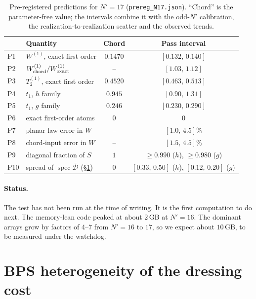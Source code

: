 \documentclass[11pt]{article}
\newcommand{\Np}{N'}
\newcommand{\Dbar}{\bar{\mathcal D}}
\newcommand{\Wone}{W^{(1)}}
\theoremstyle{plain}
\theoremstyle{remark}
\numberwithin{equation}{section}
\begin{document}
\begin{table}[ht]
\centering\small
\caption{Pre-registered predictions for $\Np=17$ (\texttt{prereg\_N17.json}). ``Chord'' is the parameter-free value; the
intervals combine it with the odd-$\Np$ calibration, the realization-to-realization scatter and the observed trends.}
\label{tab:prereg}
\begin{tabular}{@{}l>{\raggedright\arraybackslash}p{}cc@{}}\toprule
& Quantity & Chord & Pass interval\\\midrule
P1 & $\Wone$, exact first order & $0.1470$ & $[0.132,\,0.140]$\\
P2 & $\Wone_{\rm chord}/\Wone_{\rm exact}$ & -- & $[1.03,\,1.12]$\\
P3 & $T_2^{(1)}$, exact first order & $0.4520$ & $[0.463,\,0.513]$\\
P4 & $t_1$, $h$ family & $0.945$ & $[0.90,\,1.31]$\\
P5 & $t_1$, $g$ family & $0.246$ & $[0.230,\,0.290]$\\
P6 & exact first-order atoms & 0 & $0$\\
P7 & planar-law error in $W$ & -- & $[1.0,\,4.5]\%$\\
P8 & chord-input error in $W$ & -- & $[1.5,\,4.5]\%$\\
P9 & diagonal fraction of $S$ & $1$ & $\ge0.990$ ($h$), $\ge0.980$ ($g$)\\
P10 & spread of $\operatorname{spec}\Dbar$ (\S\ref{sec:hetero}) & $0$ & $[0.33,\,0.50]$ ($h$), $[0.12,\,0.20]$ ($g$)\\\bottomrule
\end{tabular}
\end{table}

\paragraph{Status.} The test has not been run at the time of writing. It is the first computation to do next. The
memory-lean code peaked at about $2$\,GB at $\Np=16$. The dominant arrays grow by factors of $4$--$7$ from $\Np=16$ to
$17$, so we expect about $10$\,GB, to be measured under the watchdog.

\section{BPS heterogeneity of the dressing cost}\label{sec:hetero}
\end{document}
